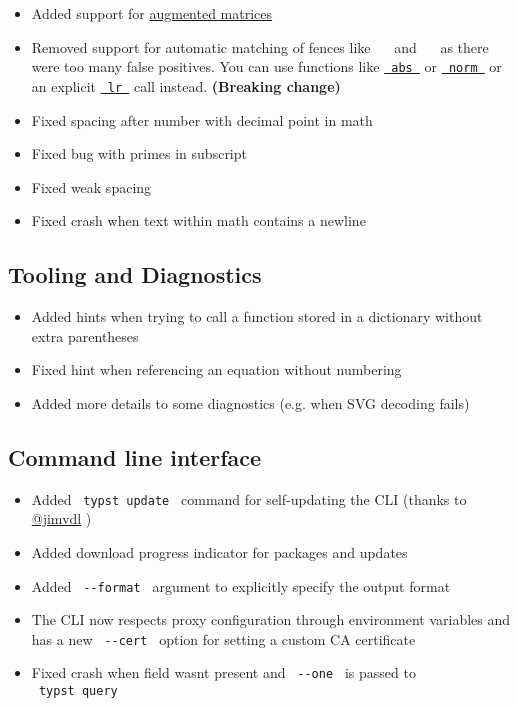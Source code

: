 \begin{itemize}
\tightlist
\item
  Added support for
  \href{/docs/reference/math/mat/\#parameters-augment}{augmented
  matrices}
\item
  Removed support for automatic matching of fences like
  \texttt{\ \textbar{}\ } and \texttt{\ \textbar{}\textbar{}\ } as there
  were too many false positives. You can use functions like
  \href{/docs/reference/math/lr/\#functions-abs}{\texttt{\ abs\ }} or
  \href{/docs/reference/math/lr/\#functions-norm}{\texttt{\ norm\ }} or
  an explicit
  \href{/docs/reference/math/lr/\#functions-lr}{\texttt{\ lr\ }} call
  instead. \textbf{(Breaking change)}
\item
  Fixed spacing after number with decimal point in math
\item
  Fixed bug with primes in subscript
\item
  Fixed weak spacing
\item
  Fixed crash when text within math contains a newline
\end{itemize}

\subsection{Tooling and Diagnostics}\label{tooling-and-diagnostics}

\begin{itemize}
\tightlist
\item
  Added hints when trying to call a function stored in a dictionary
  without extra parentheses
\item
  Fixed hint when referencing an equation without numbering
\item
  Added more details to some diagnostics (e.g. when SVG decoding fails)
\end{itemize}

\subsection{Command line interface}\label{command-line-interface}

\begin{itemize}
\tightlist
\item
  Added \texttt{\ typst\ update\ } command for self-updating the CLI
  (thanks to \href{https://github.com/jimvdl}{@jimvdl} )
\item
  Added download progress indicator for packages and updates
\item
  Added \texttt{\ -\/-format\ } argument to explicitly specify the
  output format
\item
  The CLI now respects proxy configuration through environment variables
  and has a new \texttt{\ -\/-cert\ } option for setting a custom CA
  certificate
\item
  Fixed crash when field wasn\textquotesingle t present and
  \texttt{\ -\/-one\ } is passed to \texttt{\ typst\ query\ }
\end{itemize}


